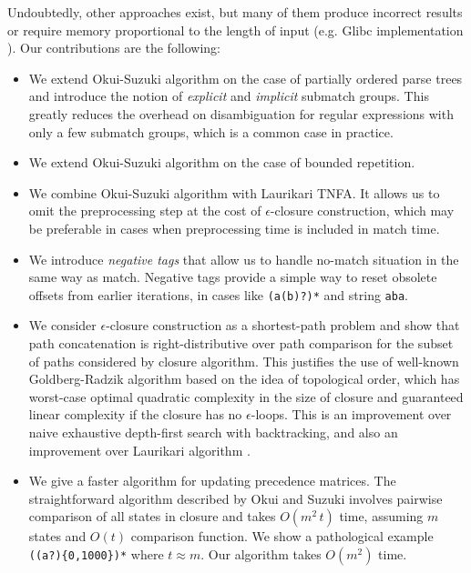 \documentclass[AMA,STIX1COL]{WileyNJD-v2}
\begin{document}
Undoubtedly, other approaches exist,
but many of them produce incorrect results or require memory proportional to the length of input
(e.g. Glibc implementation \cite{Glibc}).
%
Our contributions are the following:
\begin{itemize}[itemsep=0.5em, topsep=0.5em]

    \item We extend Okui-Suzuki algorithm on the case of partially ordered parse trees
        and introduce the notion of \emph{explicit} and \emph{implicit} submatch groups.
        This greatly reduces the overhead on disambiguation
        for regular expressions with only a few submatch groups,
        which is a common case in practice.

    \item We extend Okui-Suzuki algorithm on the case of bounded repetition.

    \item We combine Okui-Suzuki algorithm with Laurikari TNFA.
        It allows us to omit the preprocessing step
        at the cost of $\epsilon$-closure construction,
        which may be preferable in cases when preprocessing time is included in match time.

    \item We introduce \emph{negative tags} that allow us to handle
        no-match situation in the same way as match.
        Negative tags provide a simple way to reset obsolete offsets from earlier iterations,
        in cases like \texttt{(a(b)?)*} and string \texttt{aba}.

    \item We consider $\epsilon$-closure construction as a shortest-path problem
        and show that path concatenation is right-distributive over path comparison
        for the subset of paths considered by closure algorithm.
        This justifies the use of well-known Goldberg-Radzik algorithm based on the idea of topological order,
        which has worst-case optimal quadratic complexity in the size of closure
        and guaranteed linear complexity if the closure has no $\epsilon$-loops.
        This is an improvement over naive exhaustive depth-first search with backtracking,
        and also an improvement over Laurikari algorithm \cite{Tro17}.

    \item We give a faster algorithm for updating precedence matrices.
        The straightforward algorithm described by Okui and Suzuki involves pairwise comparison of all states in closure
        and takes $O(m^2 \, t)$ time, assuming $m$ states and $O(t)$ comparison function.
        We show a pathological example \texttt{((a?)\{0,1000\})*} where $t \approx m$.
        Our algorithm takes $O(m^2)$ time.


\end{itemize}
\end{document}
